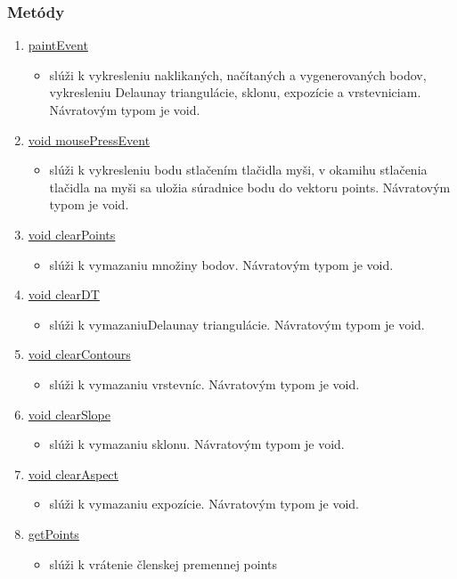 \documentclass[12pt]{article}
\begin{document}
\subsubsection{Metódy}
\begin{enumerate}
\item[] \underline{paintEvent}
\begin{itemize}
\item slúži k vykresleniu naklikaných, načítaných  a vygenerovaných bodov, vykresleniu Delaunay triangulácie, sklonu, expozície a vrstevniciam. Návratovým typom je void.
\end{itemize}
\item[] \underline{void mousePressEvent}
\begin{itemize}
\item slúži k vykresleniu bodu  stlačením tlačidla myši, v okamihu stlačenia tlačidla na myši sa uložia súradnice bodu do vektoru points. Návratovým typom je void.
\end{itemize}
\item[] \underline{void clearPoints}
\begin{itemize}
\item slúži k vymazaniu množiny bodov. Návratovým typom je void.
\end{itemize}
\item[] \underline{void clearDT}
\begin{itemize}
\item slúži k vymazaniuDelaunay triangulácie. Návratovým typom je void.
\end{itemize}
\item[] \underline{void clearContours}
\begin{itemize}
\item slúži k vymazaniu vrstevníc. Návratovým typom je void.
\end{itemize}
\item[] \underline{void clearSlope}
\begin{itemize}
\item slúži k vymazaniu sklonu. Návratovým typom je void.
\end{itemize}
\item[] \underline{void clearAspect}
\begin{itemize}
\item slúži k vymazaniu expozície. Návratovým typom je void.
\end{itemize}

\item[] \underline{getPoints}
\begin{itemize}
\item slúži k vrátenie členskej premennej points
\end{itemize}


\end{enumerate}
\end{document}
